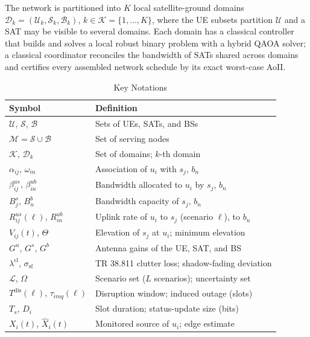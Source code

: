 The network is partitioned into $K$ local satellite-ground domains $\mathcal{D}_k=(\mathscr{U}_k,\mathscr{S}_k,
\mathscr{B}_k)$, $k\in\mathscr{K}=\{1,\ldots,K\}$, where the UE subsets partition $\mathscr{U}$ and a SAT may be
visible to several domains. Each domain has a classical controller that builds and solves a local robust binary
problem with a hybrid QAOA solver; a classical coordinator reconciles the bandwidth of SATs shared across domains and
certifies every assembled network schedule by its exact worst-case AoII.

\begin{table}[!t]
\centering
\caption{Key Notations}
\label{tab:notation}
\footnotesize
\renewcommand{\arraystretch}{1.15}
\begin{tabular}{|p{}|p{}|}
\hline
\textbf{Symbol} & \textbf{Definition} \\
\hline
$\mathscr{U}$, $\mathscr{S}$, $\mathscr{B}$ & Sets of UEs, SATs, and BSs \\
\hline
$\mathscr{M}=\mathscr{S}\cup\mathscr{B}$ & Set of serving nodes \\
\hline
$\mathscr{K}$, $\mathcal{D}_k$ & Set of domains; $k$-th domain \\
\hline
$\alpha_{ij}$, $\omega_{in}$ & Association of $u_i$ with $s_j$, $b_n$ \\
\hline
$\beta^{us}_{ij}$, $\beta^{ub}_{in}$ & Bandwidth allocated to $u_i$ by $s_j$, $b_n$ \\
\hline
$B^{s}_{j}$, $B^{b}_{n}$ & Bandwidth capacity of $s_j$, $b_n$ \\
\hline
$R^{us}_{ij}(\ell)$, $R^{ub}_{in}$ & Uplink rate of $u_i$ to $s_j$ (scenario $\ell$), to $b_n$ \\
\hline
$V_{ij}(t)$, $\Theta$ & Elevation of $s_j$ at $u_i$; minimum elevation \\
\hline
$G^{u}$, $G^{s}$, $G^{b}$ & Antenna gains of the UE, SAT, and BS \\
\hline
$\lambda^{\mathrm{cl}}$, $\sigma_{\mathrm{sf}}$ & TR 38.811 clutter loss; shadow-fading deviation \\
\hline
$\mathscr{L}$, $\Omega$ & Scenario set ($L$ scenarios); uncertainty set \\
\hline
$T^{\mathrm{dis}}(\ell)$, $\tau_{imq}(\ell)$ & Disruption window; induced outage (slots) \\
\hline
$T_s$, $D_i$ & Slot duration; status-update size (bits) \\
\hline
$X_i(t)$, $\hat{X}_i(t)$ & Monitored source of $u_i$; edge estimate \\

\end{tabular}
\end{table}

